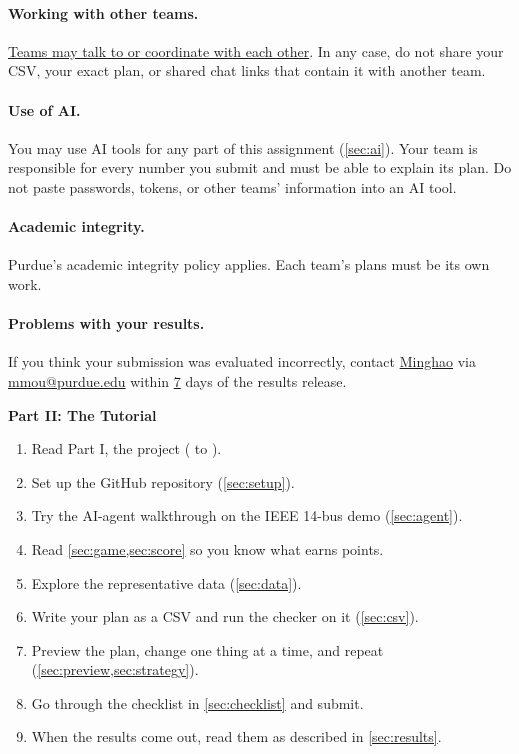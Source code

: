 \documentclass[10pt]{article}
\newcommand{\alert}[1]{{\color{alertblue}\uline{#1}}}
\begin{document}
\paragraph{Working with other teams.} \alert{Teams may talk to or
coordinate with each other}. In any case, do not share your CSV, your exact
plan, or shared chat links that contain it with another team.

\paragraph{Use of AI.} You may use AI tools for any part of this assignment
(\cref{sec:ai}). Your team is responsible for every number you submit and
must be able to explain its plan. Do not paste passwords, tokens, or other
teams' information into an AI tool.

\paragraph{Academic integrity.} Purdue's academic integrity policy applies.
Each team's plans must be its own work.

\paragraph{Problems with your results.} If you think your submission was
evaluated incorrectly, contact \alert{Minghao} via \alert{mmou@purdue.edu} within \alert{7} days of the
results release.

\fi
\newpage
{}
\begin{center}
\Large\bfseries Part II: The Tutorial
\end{center}

\begin{keybox}
\begin{enumerate}[leftmargin=*]
  \item Read Part I, the project ( to
    ).
  \item Set up the GitHub repository (\cref{sec:setup}).
  \item Try the AI-agent walkthrough on the IEEE 14-bus demo (\cref{sec:agent}).
  \item Read \cref{sec:game,sec:score} so you know what earns points.
  \item Explore the representative data (\cref{sec:data}).
  \item Write your plan as a CSV and run the checker on it (\cref{sec:csv}).
  \item Preview the plan, change one thing at a time, and repeat (\cref{sec:preview,sec:strategy}).
  \item Go through the checklist in \cref{sec:checklist} and submit.
  \item When the results come out, read them as described in \cref{sec:results}.
\end{enumerate}
\end{keybox}
\end{document}
